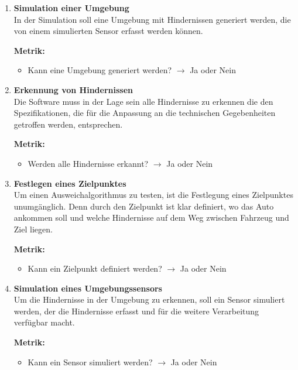 \begin{enumerate}[leftmargin=*]
    \item \textbf{Simulation einer Umgebung}\\
    In der Simulation soll eine Umgebung mit Hindernissen generiert werden, die von einem simulierten Sensor erfasst werden können.

    \textbf{Metrik:} 
    \begin{itemize}
        \item Kann eine Umgebung generiert werden? $\to$ Ja oder Nein
    \end{itemize}
    
    \item \textbf{Erkennung von Hindernissen}\\
    Die Software muss in der Lage sein alle Hindernisse zu erkennen die den Spezifikationen, 
    die für die Anpassung an die technischen Gegebenheiten getroffen werden, 
    entsprechen.

    \textbf{Metrik:} 
    \begin{itemize}
        \item Werden alle Hindernisse erkannt? $\to$ Ja oder Nein
    \end{itemize}
    
    \item \textbf{Festlegen eines Zielpunktes}\\
    Um einen Ausweichalgorithmus zu testen, ist die Festlegung eines Ziel\-punktes unumgänglich. 
    Denn durch den Zielpunkt ist klar definiert, wo das Auto ankommen soll und welche Hindernisse auf dem Weg zwischen Fahrzeug und Ziel liegen.

    \textbf{Metrik:} 
    \begin{itemize}
        \item Kann ein Zielpunkt definiert werden? $\to$ Ja oder Nein
    \end{itemize}
    
    \item \textbf{Simulation eines Umgebungssensors}\\
    Um die Hindernisse in der Umgebung zu erkennen, soll ein Sensor simuliert werden, der die Hindernisse erfasst und für die weitere Verarbeitung verfügbar macht.

    \textbf{Metrik:}
    \begin{itemize}
        \item Kann ein Sensor simuliert werden? $\to$ Ja oder Nein
    \end{itemize}
    

\end{enumerate}

